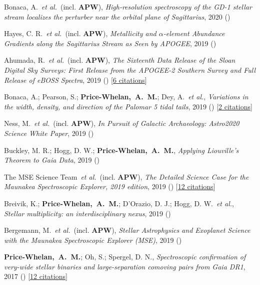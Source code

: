 \item[{\color{deemph}\scriptsize10}]Bonaca, A.~\textit{et al.}~(incl. \textbf{APW}), \textit{High-resolution spectroscopy of the GD-1 stellar stream localizes the perturber near the orbital plane of Sagittarius}, 2020 ()

\item[{\color{deemph}\scriptsize9}]Hayes, C. R.~\textit{et al.}~(incl. \textbf{APW}), \textit{Metallicity and $\alpha$-element Abundance Gradients along the Sagittarius Stream as Seen by APOGEE}, 2019 ()

\item[{\color{deemph}\scriptsize8}]Ahumada, R.~\textit{et al.}~(incl. \textbf{APW}), \textit{The Sixteenth Data Release of the Sloan Digital Sky Surveys: First Release from the APOGEE-2 Southern Survey and Full Release of eBOSS Spectra}, 2019 () [\href{http://adsabs.harvard.edu/abs/2019arXiv191202905A}{6 citations}]

\item[{\color{deemph}\scriptsize7}]Bonaca, A.; Pearson, S.; \textbf{Price-Whelan,~A.~M.}; Dey, A.~\textit{et al.}, \textit{Variations in the width, density, and direction of the Palomar 5 tidal tails}, 2019 () [\href{http://adsabs.harvard.edu/abs/2019arXiv191000592B}{2 citations}]

\item[{\color{deemph}\scriptsize6}]Ness, M.~\textit{et al.}~(incl. \textbf{APW}), \textit{In Pursuit of Galactic Archaeology: Astro2020 Science White Paper}, 2019 ()

\item[{\color{deemph}\scriptsize5}]Buckley, M. R.; Hogg, D. W.; \textbf{Price-Whelan,~A.~M.}, \textit{Applying Liouville's Theorem to Gaia Data}, 2019 ()

\item[{\color{deemph}\scriptsize4}]The MSE Science Team~\textit{et al.}~(incl. \textbf{APW}), \textit{The Detailed Science Case for the Maunakea Spectroscopic Explorer, 2019 edition}, 2019 () [\href{http://adsabs.harvard.edu/abs/2019arXiv190404907T}{12 citations}]

\item[{\color{deemph}\scriptsize3}]Breivik, K.; \textbf{Price-Whelan,~A.~M.}; D'Orazio, D. J.; Hogg, D. W.~\textit{et al.}, \textit{Stellar multiplicity: an interdisciplinary nexus}, 2019 ()

\item[{\color{deemph}\scriptsize2}]Bergemann, M.~\textit{et al.}~(incl. \textbf{APW}), \textit{Stellar Astrophysics and Exoplanet Science with the Maunakea Spectroscopic Explorer (MSE)}, 2019 ()

\item[{\color{deemph}\scriptsize1}]\textbf{Price-Whelan,~A.~M.}; Oh, S.; Spergel, D. N., \textit{Spectroscopic confirmation of very-wide stellar binaries and large-separation comoving pairs from Gaia DR1}, 2017 () [\href{http://adsabs.harvard.edu/abs/2017arXiv170903532P}{12 citations}]